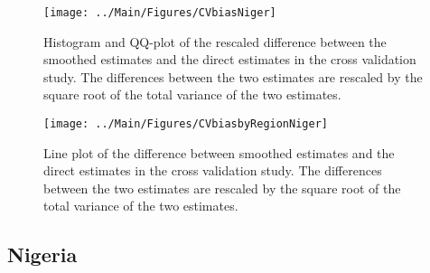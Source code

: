 \documentclass[12pt]{article}\usepackage[]{graphicx}\usepackage[]{color}
\newenvironment{knitrout}{}{} %
\begin{document}
\begin{knitrout}
\color{fgcolor}\begin{figure}[bht]

{\centering \texttt{[image: ../Main/Figures/CVbiasNiger]} 

}

\caption[Histogram and QQ-plot of the rescaled difference between the smoothed estimates and the direct estimates in the cross validation study]{Histogram and QQ-plot of the rescaled difference between the smoothed estimates and the direct estimates in the cross validation study. The differences between the two estimates are rescaled by the square root of the total variance of the two estimates.}\label{fig:unnamed-chunk-259}
\end{figure}


\end{knitrout}

\begin{knitrout}
\color{fgcolor}\begin{figure}[bht]

{\centering \texttt{[image: ../Main/Figures/CVbiasbyRegionNiger]} 

}

\caption[Line plot of the difference between smoothed estimates and the direct estimates in the cross validation study]{Line plot of the difference between smoothed estimates and the direct estimates in the cross validation study. The differences between the two estimates are rescaled by the square root of the total variance of the two estimates.}\label{fig:unnamed-chunk-260}
\end{figure}


\end{knitrout}


\clearpage
\subsection{Nigeria}


\end{document}
